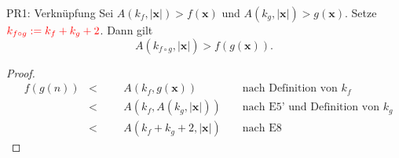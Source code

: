\documentclass[a4paper]{amsart}
\theoremstyle{definition}
\newcommand{\bb}[1]{\mathbf{#1}}
\begin{document}
\begin{Theorem}{PR1: Verknüpfung}
    Sei $A( k_f, |\bb{x}| ) > f( \bb{x} )$ und $A( k_g, |\bb{x}| ) > g( \bb{x} )$. Setze
    $\color{red}{k_{f \circ g} := k_f + k_g + 2}$. Dann gilt
    \begin{equation*}
        A( k_{f \circ g}, |\bb{x}| ) > f ( g (\bb{x})).
    \end{equation*}
\end{Theorem}
\begin{proof}
    \begin{align*}
        &f(g(n)) & < &&& A(k_f, g(\bb{x}))          &&\text{ nach Definition von } k_f\\
        &        & < &&& A(k_f, A(k_g, |\bb{x}|))   &&\text{ nach E5' und Definition von } k_g\\
        &        & < &&& A(k_f + k_g + 2, |\bb{x}|) &&\text{ nach E8 }
    \end{align*}
\end{proof}
\end{document}
